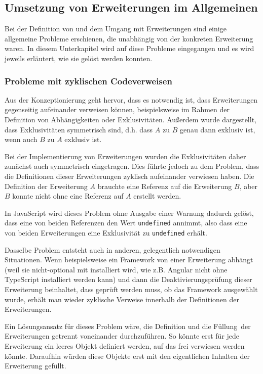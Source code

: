 \subsection{Umsetzung von Erweiterungen im Allgemeinen}
Bei der Definition von und dem Umgang mit Erweiterungen sind einige allgemeine Probleme erschienen, die unabhängig von der konkreten Erweiterung waren. In diesem Unterkapitel wird auf diese Probleme eingegangen und es wird jeweils erläutert, wie sie gelöst werden konnten.

\subsubsection{Probleme mit zyklischen Codeverweisen}
Aus der Konzeptionierung geht hervor, dass es notwendig ist, dass Erweiterungen gegenseitig aufeinander verweisen können, beispielsweise im Rahmen der Definition von Abhängigkeiten oder Exklusivitäten. Außerdem wurde dargestellt, dass Exklusivitäten symmetrisch sind, d.h. dass $A$ zu $B$ genau dann exklusiv ist, wenn auch $B$ zu $A$ exklusiv ist.

Bei der Implementierung von Erweiterungen wurden die Exklusivitäten daher zunächst auch symmetrisch eingetragen. Dies führte jedoch zu dem Problem, dass die Definitionen dieser Erweiterungen zyklisch aufeinander verwiesen haben. Die Definition der Erweiterung $A$ brauchte eine Referenz auf die Erweiterung $B$, aber $B$ konnte nicht ohne eine Referenz auf $A$ erstellt werden.

In JavaScript wird dieses Problem ohne Ausgabe einer Warnung dadurch gelöst, dass eine von beiden Referenzen den Wert \verb|undefined| annimmt, also dass eine von beiden Erweiterungen eine Exklusivität zu \verb|undefined| erhält.

Dasselbe Problem entsteht auch in anderen, gelegentlich notwendigen Situationen. Wenn beispielsweise ein Framework von einer Erweiterung abhängt (weil sie nicht-optional mit installiert wird, wie z.B. Angular nicht ohne TypeScript installiert werden kann) und dann die Deaktivierungsprüfung dieser Erweiterung beinhaltet, dass geprüft werden muss, ob das Framework ausgewählt wurde, erhält man wieder zyklische Verweise innerhalb der Definitionen der Erweiterungen.

Ein Lösungsansatz für dieses Problem wäre, die Definition und die \glqq Füllung\grqq\ der Erweiterungen getrennt voneinander durchzuführen. So könnte erst für jede Erweiterung ein leeres Objekt definiert werden, auf das frei verwiesen werden könnte. Daraufhin würden diese Objekte erst mit den eigentlichen Inhalten der Erweiterung gefüllt.


